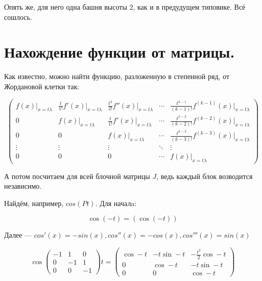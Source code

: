 \documentclass[12pt, a4paper]{article}
\begin{document}
    Опять же, для него одна башня высоты 2, как и в предудущем типовике. Всё сошлось.


    \section{Нахождение функции от матрицы.}

    Как известно, можно найти функцию, разложенную в степенной ряд, от Жордановой клетки так:

    \begin{equation}
        \begin{pmatrix}
            f(x){\Bigr |}_{x=t\lambda} & \frac t{1!}f'(x){\Bigr |}_{x=t\lambda} & \frac{t^2}{2!}f''(x){\Bigr |}_{x=t\lambda} & \cdots & \frac{t^{k-1}}{(k-1)!}f^{(k-1)}(x){\Bigr |}_{x=t\lambda}\\
                0 & f(x){\Bigr |}_{x=t\lambda} & \frac t{1!}f'(x){\Bigr |}_{x=t\lambda} & \cdots & \frac{t^{k-2}}{(k-2)!}f^{(k-2)}(x){\Bigr |}_{x=t\lambda}\\
                0 & 0 & f(x){\Bigr |}_{x=t\lambda} & \cdots & \frac{t^{k-3}}{(k-3)!}f^{(k-3)}(x){\Bigr |}_{x=t\lambda}\\
                \vdots & \vdots & \vdots & \ddots & \vdots\\
                0 & 0 & 0 & \cdots & f(x){\Bigr |}_{x=t\lambda}
        \end{pmatrix}
    \end{equation}

    А потом посчитаем для всей блочной матрицы $J$, ведь каждый блок возводится независимо.

    Найдём, например, $cos(Pt)$. Для началa:

    \begin{equation}
        \cos\left( -t \right) = \left( \cos (-t) \right)
    \end{equation}

    Далее — $cos'(x) = -sin(x), cos''(x) = -cos(x), cos'''(x) = sin(x)$

    \begin{equation}
        \cos\left(\begin{matrix}
            -1 & 1 & 0 \\
            0 & -1 & 1 \\
            0 & 0 & -1
        \end{matrix}\right) t = \left(\begin{matrix}
            \cos -t & -t \sin -t & -\frac{t^2}{2} \cos -t \\
            0 & \cos -t & -t \sin -t \\
            0 & 0 & \cos -t
        \end{matrix}\right)
    \end{equation}
\end{document}
